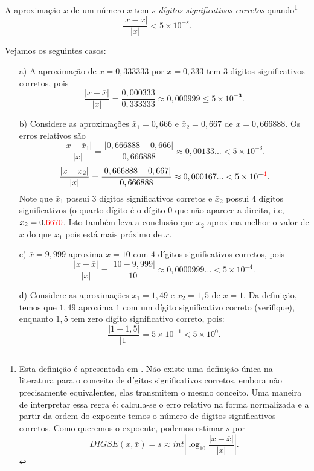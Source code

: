 \begin{defn}\label{def:num_dig_sig_corretos}
A aproximação $\overline{x}$ de um número $x$ tem $s$ \emph{dígitos significativos corretos} quando\footnote{Esta definição é apresentada em \cite{Burden2013}. Não existe uma definição única na literatura para o conceito de dígitos significativos corretos, embora não precisamente equivalentes, elas transmitem o mesmo conceito.
Uma maneira de interpretar essa regra é: calcula-se o erro relativo na forma normalizada e a partir da ordem do expoente temos o número de dígitos significativos corretos. Como queremos o expoente, podemos estimar $s$ por
$$ DIGSE(x,\bar{x})=s \approx int \left|\log_{10} \frac{|x-\overline{x}|}{|x|}\right|. $$
}
$$
\frac{|x-\overline{x}|}{|x|} < 5\times 10^{-s}.
$$
\end{defn}


\begin{ex} Vejamos os seguintes casos:
\begin{itemize}
\item[a)] A aproximação de $x=0,333333$ por $\overline{x}=0,333$ tem $3$ dígitos significativos corretos, pois
  \begin{equation*}
    \frac{|x-\overline{x}|}{|x|} = \frac{0,000333}{0,333333} \approx 0,000999 \leq 5\times 10^{-\pmb{3}}.
  \end{equation*}
\item[b)] Considere as aproximações $\bar{x}_1=0,666$ e $\bar{x}_2=0,667$ de $x=0,666888$. Os erros relativos são
  $$
    \frac{|x-\bar{x}_1|}{|x|} = \frac{|0,666888-0,666|}{0,666888} \approx 0,00133...< 5\times 10^{-3}.
  $$
  $$
    \frac{|x-\bar{x}_2|}{|x|} = \frac{|0,666888-0,667|}{0,666888} \approx 0,000167...< 5\times 10^{-{\color{red}{4}}}.
  $$
  Note que $\bar{x}_1$ possui $3$ dígitos significativos corretos e $\bar{x}_2$ possui $4$ dígitos significativos (o quarto dígito é o dígito $0$ que não aparece a direita, i.e, $\bar{x}_2=0.{\color{red}{6670}}$. Isto também leva a conclusão que $x_2$ aproxima melhor o valor de $x$ do que $x_1$ pois está mais próximo de $x$.

\item[c)] $\overline{x} = 9,999$ aproxima $x = 10$ com $4$ dígitos significativos corretos, pois
  \begin{equation*}
    \frac{|x-\overline{x}|}{|x|} = \frac{|10 - 9,999|}{10} \approx 0,0000999...< 5\times 10^{-4}.
  \end{equation*}
\item[d)] Considere as aproximações $\overline{x}_1 = 1,49$ e $\overline{x}_2 = 1,5$ de $x = 1$. Da definição, temos que $1,49$ aproxima $1$ com um dígito significativo correto (verifique), enquanto $1,5$ tem zero dígito significativo correto, pois:
  \begin{equation*}
    \frac{|1-1,5|}{|1|} = 5\times 10^{-1} < 5\times 10^{0}.
  \end{equation*}
\end{itemize}
\end{ex}

